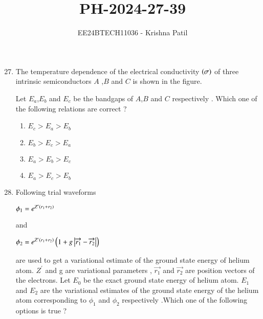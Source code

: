 \documentclass[journal]{IEEEtran}
\begin{document}

\vspace{3cm}

\title{PH-2024-27-39}
\author{EE24BTECH11036 - Krishna Patil}
{\let\newpage\relax\maketitle}
\begin{enumerate}
\setcounter{enumi}{26}
\item The temperature dependence of the electrical conductivity $\left(\sigma\right)$ of three intrinsic semiconductors $ A$ ,$B$ and $C$ is shown in the figure.
\begin{figure}[!ht]
\centering
{}
\label{fig:my_label}
\end{figure}
Let $E_a$,$E_b$ and $E_c$ be the bandgaps of $A$,$B$ and $C$ respectively . Which one of the following relations are correct ? 
\begin{enumerate}
\item $E_c>E_a>E_b$
\item $E_b>E_c>E_a$ 
\item $E_a>E_b>E_c$
\item $E_a>E_c>E_b$
\end{enumerate}
\item Following trial waveforms \begin{center} $\phi_1 =e^{Z^{\prime}\left(r_1+r_2\right)}$ \end{center}  and \begin{center} $\phi_2 =e^{Z^{\prime}\left(r_1+r_2\right)}\left(1+g\left\vert\overrightarrow{r_1}-\overrightarrow{r_2}\right\vert\right)$ \end{center} are used to get a variational estimate of the ground state energy of helium atom. $Z^{\prime}$ and g are variational parameters , $\overrightarrow{r_1}$ and $\overrightarrow{r_2}$ are position vectors of the electrons. Let $E_0$ be the exact ground state energy of helium atom. $E_1$ and $E_2$ are the variational estimates of the ground state energy of the helium atom corresponding to $\phi_1$ and $\phi_2$ respectively .Which one of the following options is true ?

\end{enumerate}
\end{document}
